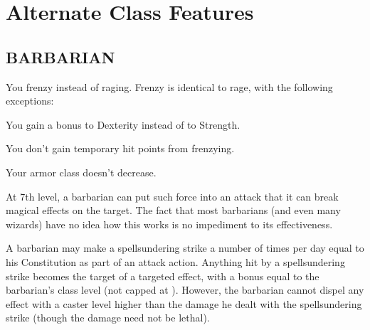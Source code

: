 \chapter{Alternate Class Features}

\section*{BARBARIAN}
 You frenzy instead of raging. Frenzy is identical to rage, with the following exceptions:
\begin{itemize*}
\item You gain a bonus to Dexterity instead of to Strength.
\item You don't gain temporary hit points from frenzying.
\item Your armor class doesn't decrease.
\end{itemize*}

 At 7th level, a barbarian can put such force into an attack that it can break magical effects on the target. The fact that most barbarians (and even many wizards) have no idea how this works is no impediment to its effectiveness.
\par A barbarian may make a spellsundering strike a number of times per day equal to his Constitution as part of an attack action. Anything hit by a spellsundering strike becomes the target of a targeted  effect, with a bonus equal to the barbarian's class level (not capped at ). However, the barbarian cannot dispel any effect with a caster level higher than the damage he dealt with the spellsundering strike (though the damage need not be lethal).